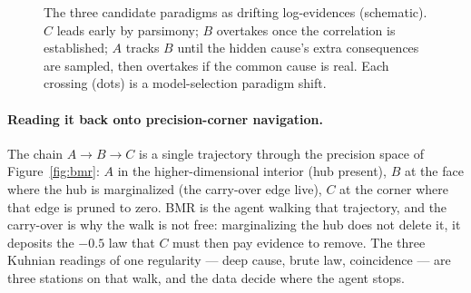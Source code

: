 \begin{figure}[ht]
\centering
{}
\caption{The three candidate paradigms as drifting log-evidences
(schematic). $C$ leads early by parsimony; $B$ overtakes once the
correlation is established; $A$ tracks $B$ until the hidden cause's extra
consequences are sampled, then overtakes if the common cause is real.
Each crossing (dots) is a model-selection paradigm shift.}
\label{fig:abc-dyn}
\end{figure}

\paragraph{Reading it back onto precision-corner navigation.} The chain
$A\to B\to C$ is a single trajectory through the precision space of
Figure~\ref{fig:bmr}: $A$ in the higher-dimensional interior (hub
present), $B$ at the face where the hub is marginalized (the carry-over
edge live), $C$ at the corner where that edge is pruned to zero. BMR is
the agent walking that trajectory, and the carry-over is why the walk is
not free: marginalizing the hub does not delete it, it deposits the
$-0.5$ law that $C$ must then pay evidence to remove. The three Kuhnian
readings of one regularity --- deep cause, brute law, coincidence ---
are three stations on that walk, and the data decide where the agent
stops.

